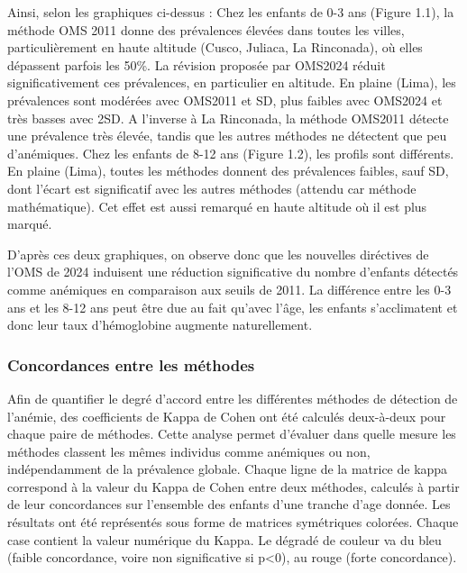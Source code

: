 \documentclass[12pt,a4paper]{article}
\begin{document}
Ainsi, selon les graphiques ci-dessus :
Chez les enfants de 0-3 ans (Figure 1.1), la méthode OMS 2011 donne des prévalences élevées dans toutes les villes, particulièrement en haute altitude (Cusco, Juliaca, La Rinconada), où elles dépassent parfois les 50\%. La révision proposée par OMS2024 réduit significativement ces prévalences, en particulier en altitude. En plaine (Lima), les prévalences sont modérées avec OMS2011 et SD, plus faibles avec OMS2024 et très basses avec 2SD. A l'inverse à La Rinconada, la méthode OMS2011 détecte une prévalence très élevée, tandis que les autres méthodes ne détectent que peu d'anémiques.
Chez les enfants de 8-12 ans (Figure 1.2), les profils sont différents. En plaine (Lima), toutes les méthodes donnent des prévalences faibles, sauf SD, dont l'écart est significatif avec les autres méthodes (attendu car méthode mathématique). Cet effet est aussi remarqué en haute altitude où il est plus marqué.

D'après ces deux graphiques, on observe donc que les nouvelles diréctives de l'OMS de 2024 induisent une réduction significative du nombre d'enfants détectés comme anémiques en comparaison aux seuils de 2011. La différence entre les 0-3 ans et les 8-12 ans peut être due au fait qu'avec l'âge, les enfants s'acclimatent et donc leur taux d'hémoglobine augmente naturellement.


\subsubsection{Concordances entre les méthodes}

Afin de quantifier le degré d'accord entre les différentes méthodes de détection de l'anémie, des coefficients de Kappa de Cohen ont été calculés deux-à-deux pour chaque paire de méthodes. Cette analyse permet d'évaluer dans quelle mesure les méthodes classent les mêmes individus comme anémiques ou non, indépendamment de la prévalence globale. Chaque ligne de la matrice de kappa correspond à la valeur du Kappa de Cohen entre deux méthodes, calculés à partir de leur concordances sur l'ensemble des enfants d'une tranche d'age donnée. Les résultats ont été représentés sous forme de matrices symétriques colorées. Chaque case contient la valeur numérique du Kappa. Le dégradé de couleur va du bleu (faible concordance, voire non significative si p<0), au rouge (forte concordance).
\end{document}
